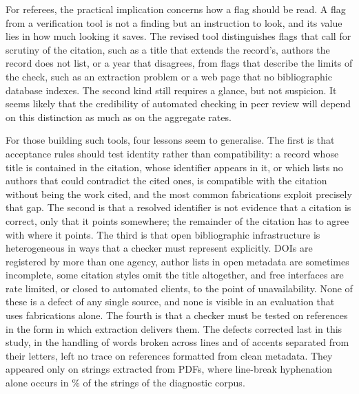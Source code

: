 \documentclass[pdflatex,sn-apa]{sn-jnl}
\begin{document}
For referees, the practical implication concerns how a flag should be read. A flag from a verification tool is not a finding but an instruction to look, and its value lies in how much looking it saves. The revised tool distinguishes flags that call for scrutiny of the citation, such as a title that extends the record's, authors the record does not list, or a year that disagrees, from flags that describe the limits of the check, such as an extraction problem or a web page that no bibliographic database indexes. The second kind still requires a glance, but not suspicion. It seems likely that the credibility of automated checking in peer review will depend on this distinction as much as on the aggregate rates.

For those building such tools, four lessons seem to generalise. The first is that acceptance rules should test identity rather than compatibility: a record whose title is contained in the citation, whose identifier appears in it, or which lists no authors that could contradict the cited ones, is compatible with the citation without being the work cited, and the most common fabrications exploit precisely that gap. The second is that a resolved identifier is not evidence that a citation is correct, only that it points somewhere; the remainder of the citation has to agree with where it points. The third is that open bibliographic infrastructure is heterogeneous in ways that a checker must represent explicitly. DOIs are registered by more than one agency, author lists in open metadata are sometimes incomplete, some citation styles omit the title altogether, and free interfaces are rate limited, or closed to automated clients, to the point of unavailability. None of these is a defect of any single source, and none is visible in an evaluation that uses fabrications alone. The fourth is that a checker must be tested on references in the form in which extraction delivers them. The defects corrected last in this study, in the handling of words broken across lines and of accents separated from their letters, left no trace on references formatted from clean metadata. They appeared only on strings extracted from PDFs, where line-break hyphenation alone occurs in \FeatHyphenAll{}\% of the strings of the diagnostic corpus.
\end{document}
